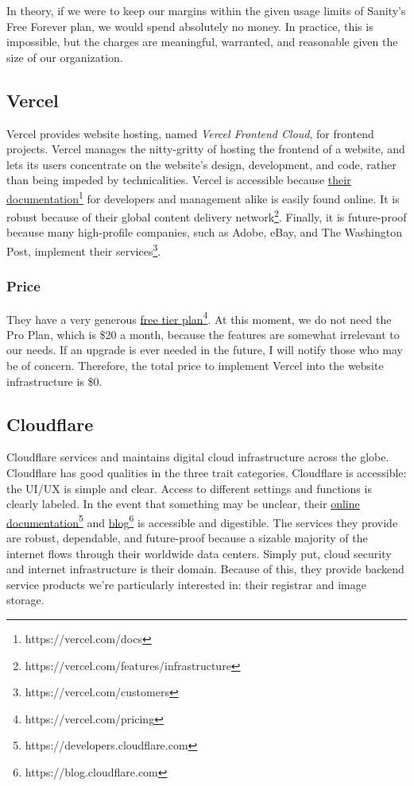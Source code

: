 In theory, if we were to keep our margins within the given usage limits of Sanity's Free Forever plan, we would spend absolutely no money. In practice, this is impossible, but the charges are meaningful, warranted, and reasonable given the size of our organization.

\subsection{Vercel}
Vercel provides website hosting, named \textit{Vercel Frontend Cloud}, for frontend projects. Vercel manages the nitty-gritty of hosting the frontend of a website, and lets its users concentrate on the website's design, development, and code, rather than being impeded by technicalities. Vercel is accessible because \href{https://vercel.com/docs}{their documentation}\footnote{https://vercel.com/docs} for developers and management alike is easily found online. It is robust because of their global content delivery network\footnote{https://vercel.com/features/infrastructure}. Finally, it is future-proof because many high-profile companies, such as Adobe, eBay, and The Washington Post, implement their services\footnote{https://vercel.com/customers}.

\subsubsection*{Price}
They have a very generous \href{https://vercel.com/pricing}{free tier plan}\footnote{https://vercel.com/pricing}. At this moment, we do not need the Pro Plan, which is \$20 a month, because the features are somewhat irrelevant to our needs. If an upgrade is ever needed in the future, I will notify those who may be of concern. Therefore, the total price to implement Vercel into the website infrastructure is \$0.

\subsection{Cloudflare}
Cloudflare services and maintains digital cloud infrastructure across the globe. Cloudflare has good qualities in the three trait categories. Cloudflare is accessible: the UI/UX is simple and clear. Access to different settings and functions is clearly labeled. In the event that something may be unclear, their \href{https://developers.cloudflare.com}{online documentation}\footnote{https://developers.cloudflare.com} and \href{https://blog.cloudflare.com/}{blog}\footnote{https://blog.cloudflare.com} is accessible and digestible. The services they provide are robust, dependable, and future-proof because a sizable majority of the internet flows through their worldwide data centers. Simply put, cloud security and internet infrastructure is their domain. Because of this, they provide backend service products we're particularly interested in: their registrar and image storage.

